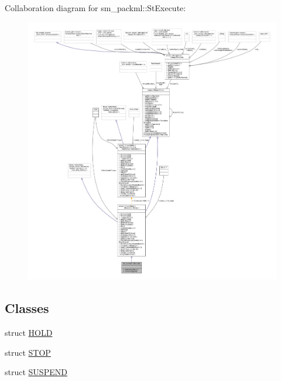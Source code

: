 Collaboration diagram for sm\+\_\+packml\+:\+:St\+Execute\+:
\nopagebreak
\begin{figure}[H]
\begin{center}
\leavevmode
\includegraphics[width=350pt]{structsm__packml_1_1StExecute__coll__graph}
\end{center}
\end{figure}
\subsection*{Classes}
\begin{DoxyCompactItemize}
\item 
struct \hyperlink{structsm__packml_1_1StExecute_1_1HOLD}{H\+O\+LD}
\item 
struct \hyperlink{structsm__packml_1_1StExecute_1_1STOP}{S\+T\+OP}
\item 
struct \hyperlink{structsm__packml_1_1StExecute_1_1SUSPEND}{S\+U\+S\+P\+E\+ND}
\end{DoxyCompactItemize}
